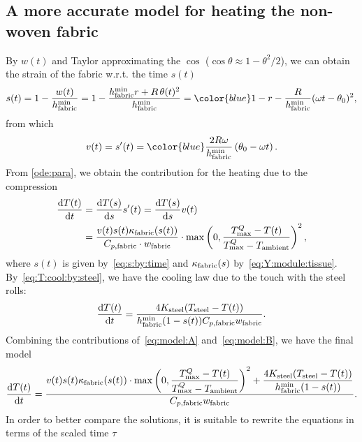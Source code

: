 \subsection{A more accurate model for heating the non-woven fabric}
By $w(t)$ and Taylor approximating the $\cos$ ($\cos\theta\approx 1-\theta^2/2$), we can obtain the strain of the fabric w.r.t. the time
$s(t)$
\begin{equation}\label{eq:s:by:time}
   s(t) = 1-\dfrac{w(t)}{\htissuemin} = 
   1-\dfrac{\htissuemin \cratio + \Roller\,\theta(t)^2}{\htissuemin}=
   \color{blue}
   1-\cratio - \dfrac{\Roller}{\htissuemin}(\VRot t - \theta_0)^2,
\end{equation}
from which 
\begin{equation}\label{eq:vel:ratio}
   v(t)=s'(t)=\color{blue}\dfrac{2\Roller\VRot}{\htissuemin}\left(\theta_0-\VRot t\right).
\end{equation}
From \eqref{ode:para}, we obtain the contribution for the heating due to the compression
\begin{equation}\label{eq:model:A}
   \begin{split}
   \dfrac{\mathrm{d} T(t)}{\mathrm{d}t}  & =  \dfrac{\mathrm{d} T(s)}{\mathrm{d}s} s'(t)  =
    \dfrac{\mathrm{d} T(s)}{\mathrm{d}s} v(t)  \\
    & =
   \dfrac{v(t)s(t)\kappa_{\mathrm{fabric}}(s(t))}{C_{p,\textrm{fabric}}\cdot w_{\mathrm{fabric}}}\cdot 
   \max\left(0,\dfrac{{T_{\max}^Q}-T(t)}{{T_{\max}^Q}-T_{\textrm{ambient}}}\right)^2,
   \end{split}
\end{equation}
where $s(t)$ is given by~\eqref{eq:s:by:time} and $\kappa_{\mathrm{fabric}}(s)$ by~\eqref{eq:Y:module:tissue}. By~\eqref{eq:T:cool:by:steel}, we have the cooling law due to the touch with the steel rolls:
\begin{equation}\label{eq:model:B}
  \dfrac{\mathrm{d}T(t)}{\mathrm{d}t}=
  \dfrac{4K_{\mathrm{steel}}(T_{\mathrm{steel}}-T(t))}{h_{\mathrm{fabric}}^{\min}(1-s(t))C_{p,\textrm{fabric}}w_{\mathrm{fabric}}}.
\end{equation}
Combining the contributions of~\eqref{eq:model:A} and~\eqref{eq:model:B}, we have the final model
\begin{equation}\label{eq:model:t}
   \dfrac{\mathrm{d} T(t)}{\mathrm{d}t}=
   \dfrac{
    v(t)s(t)\kappa_{\mathrm{fabric}}(s(t))\cdot 
   \max\left(0,\dfrac{{T_{\max}^Q}-T(t)}{{T_{\max}^Q}-T_{\textrm{ambient}}}\right)^2
   +
   \dfrac{4K_{\mathrm{steel}}(T_{\mathrm{steel}}-T(t))}{h_{\mathrm{fabric}}^{\min}(1-s(t))}
   }{C_{p,\textrm{fabric}}w_{\mathrm{fabric}}}.
\end{equation}
In order to better compare the solutions, it is suitable to rewrite the equations in terms of the scaled time $\tau$
